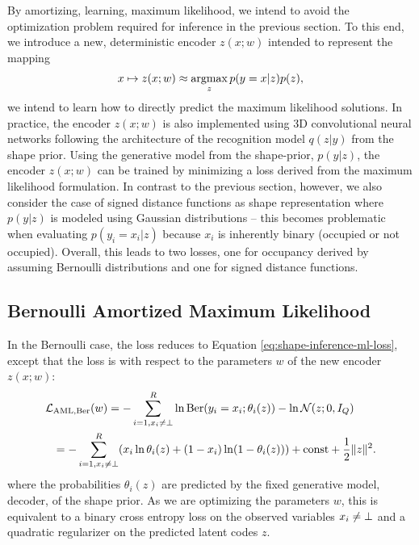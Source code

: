 By amortizing, \ie learning, maximum likelihood, we intend to avoid the
optimization problem required for inference in the previous section.
To this end, we introduce a new, deterministic encoder $z(x; w)$
intended to represent the mapping
\begin{align}
  x \mapsto z(x;w) \approx \operatorname*{argmax}_{z} p(y = x | z) p(z),
\end{align}
\ie we intend to learn how to directly predict the maximum likelihood solutions.
In practice, the encoder $z(x;w)$ is also implemented using 3D convolutional
neural networks following the architecture of the recognition model $q(z|y)$ from the shape prior.
Using the generative model from the shape-prior, \ie $p(y | z)$,
the encoder $z(x;w)$ can be trained by minimizing a loss derived from the maximum
likelihood formulation. In contrast to the previous section, however,
we also consider the case of signed distance functions as shape representation
where $p(y | z)$ is modeled using Gaussian distributions -- this becomes problematic
when evaluating $p(y_i = x_i | z)$ because $x_i$ is inherently binary (\ie occupied
or not occupied). Overall, this leads to two losses, one for occupancy
derived by assuming Bernoulli distributions and one for signed distance
functions.

\subsection{Bernoulli Amortized Maximum Likelihood}

In the Bernoulli case, the loss reduces to Equation \eqref{eq:shape-inference-ml-loss},
except that the loss is with respect to the parameters $w$ of the new encoder $z(x;w)$:
\begin{align}
  \mathcal{L}&_{\text{AML},\mathrm{Ber}}(w)
  = - \sum_{i = 1, x_i \neq \bot}^R \ln \mathrm{Ber}(y_i = x_i; \theta_i(z)) - \ln \mathcal{N}(z;0, I_Q)\\
  &= - \sum_{i = 1, x_i \neq \bot}^R (x_i \ln \theta_i(z) + (1 - x_i) \ln (1 - \theta_i(z))) + \mathrm{const} + \frac{1}{2}\|z\|^2.
  \label{eq:shape-inference-aml-occ-loss}
\end{align}
where the probabilities $\theta_i(z)$ are predicted by the fixed generative model,
\ie decoder, of the shape prior.
As we are optimizing the parameters $w$, this is equivalent to a binary cross
entropy loss on the observed variables $x_i \neq \bot$ and a quadratic regularizer
on the predicted latent codes $z$.

